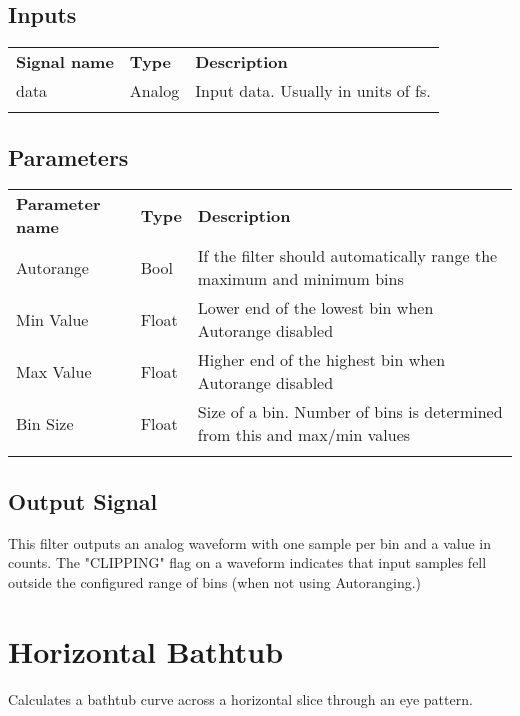 \subsection{Inputs}

\begin{tabularx}{16cm}{llX}
\thickhline
\textbf{Signal name} & \textbf{Type} & \textbf{Description} \\
\thickhline
data & Analog & Input data. Usually in units of fs.\\
\thickhline
\end{tabularx}

\subsection{Parameters}

\begin{tabularx}{16cm}{llX}
\thickhline
\textbf{Parameter name} & \textbf{Type} & \textbf{Description} \\
\thickhline
Autorange & Bool & If the filter should automatically range the maximum and minimum bins\\
\thinhline
Min Value & Float & Lower end of the lowest bin when Autorange disabled\\
\thinhline
Max Value & Float & Higher end of the highest bin when Autorange disabled\\
\thinhline
Bin Size & Float & Size of a bin. Number of bins is determined from this and max/min values\\
\thickhline
\end{tabularx}

\subsection{Output Signal}

This filter outputs an analog waveform with one sample per bin and a value in counts. The "CLIPPING" flag on a waveform
indicates that input samples fell outside the configured range of bins (when not using Autoranging.)

\pagebreak
\section{Horizontal Bathtub}

Calculates a bathtub curve across a horizontal slice through an eye pattern.

